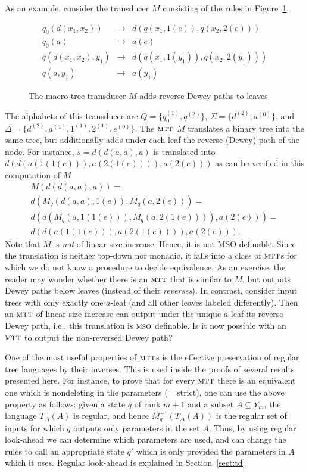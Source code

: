 \documentclass[copyright,creativecommons]{eptcs}
\newcommand{\mtt}{\textsc{mtt}}
\newcommand{\mso}{\textsc{mso}}
\begin{document}
As an example, consider the transducer $M$ consisting of the rules 
in Figure~\ref{fig:mtt}.
\begin{figure}[htb]
\[
\begin{array}{lcl}
q_0(d(x_1,x_2))&\to& d(q(x_1,1(e)), q(x_2,2(e)))\\
q_0(a)&\to& a(e)\\
q(d(x_1,x_2),y_1)&\to& d(q(x_1,1(y_1)), q(x_2,2(y_1)))\\
q(a,y_1)&\to& a(y_1)
\end{array}
\]
\caption{The macro tree transducer $M$ adds reverse Dewey paths to leaves}\label{fig:mtt}
\end{figure}
The alphabets of this transducer are
$Q=\{q_0^{(1)},q^{(2)}\}$,
$\Sigma=\{d^{(2)}, a^{(0)}\}$, and 
$\Delta=\{d^{(2)}, a^{(1)}, 1^{(1)}, 2^{(1)}, e^{(0)}\}$.
The $\mtt$ $M$ translates a binary tree into the same tree, but additionally 
adds under each leaf the reverse (Dewey) path of the node.
For instance, $s=d(d(a,a),a)$ is translated into 
$d(d(a(1(1(e))),a(2(1(e)))),a(2(e)))$
as can be verified in this computation of $M$
\[
\begin{array}{l}
M(d(d(a,a),a)) = \\
d(M_q(d(a,a), 1(e)), M_q(a, 2(e))) =\\
d(d(M_q(a, 1(1(e))), M_q(a, 2(1(e)))), a(2(e))) =\\
d(d(a(1(1(e))), a(2(1(e)))), a(2(e))).
\end{array}
\]
Note that $M$ is \emph{not} of linear size increase. 
Hence, it is not MSO definable.
Since the translation is neither top-down nor monadic, it falls into
a class of $\mtt$s for which we do not know a procedure to decide
equivalence.
As an exercise, the reader may wonder whether there is an $\mtt$ that
is similar to $M$, but outputs Dewey paths below leaves (instead of their \emph{reverses}).
In contrast,
consider input trees with only exactly one $a$-leaf (and all other leaves labeled differently).
Then an $\mtt$ of linear size increase can output under the unique $a$-leaf its 
reverse Dewey path, i.e., this translation is $\mso$ definable. Is it now possible
with an $\mtt$ to output the non-reversed Dewey path?

One of the most useful properties of $\mtt$s is the effective preservation
of regular tree languages by their inverses.
This is used inside the proofs of several results presented here.
For instance, to prove that for every $\mtt$ there is an equivalent one
which is nondeleting in the parameters (= strict), one can use the above
property as follows: given a state $q$ of rank $m+1$ and a subset
$A \subseteq Y_m$, the language $T_\Delta(A)$ is regular, and hence
$M_q^{-1}(T_\Delta(A))$ is the regular set of inputs for which $q$ outputs
only parameters in the set $A$. Thus, by using regular look-ahead
we can determine which parameters are used, and can change the rules 
to call an appropriate state $q'$ which is only provided the parameters
in $A$ which it uses. Regular look-ahead is explained in Section~\ref{sect:td}.
\end{document}

